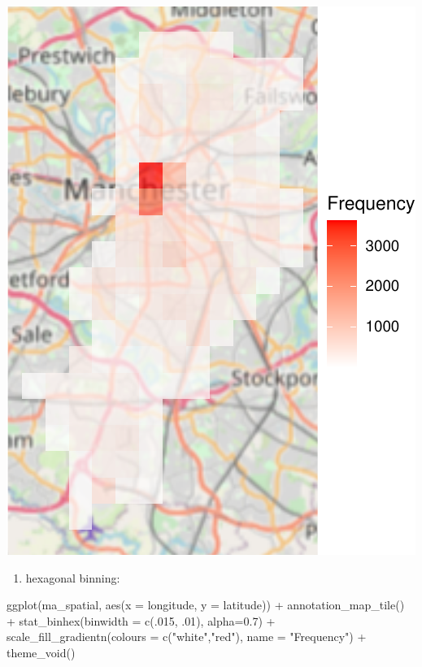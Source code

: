 \documentclass[
]{book}
\makeatletter
\newenvironment{Shaded}{\begin{snugshade}}{\end{snugshade}}
\newcommand{\AttributeTok}[1]{\textcolor[rgb]{0.61,0.61,0.61}{#1}}
\newcommand{\DecValTok}[1]{\textcolor[rgb]{0.06,0.06,0.06}{#1}}
\newcommand{\FloatTok}[1]{\textcolor[rgb]{0.06,0.06,0.06}{#1}}
\newcommand{\FunctionTok}[1]{\textcolor[rgb]{0,0,0}{#1}}
\newcommand{\NormalTok}[1]{#1}
\newcommand{\SpecialCharTok}[1]{\textcolor[rgb]{0,0,0}{#1}}
\newcommand{\StringTok}[1]{\textcolor[rgb]{0.5,0.5,0.5}{#1}}
\providecommand{\tightlist}{%
  \setlength{\itemsep}{0pt}\setlength{\parskip}{0pt}}
\newenvironment{kframe}{%
\medskip{}
\setlength{\fboxsep}{.8em}
 \def\at@end@of@kframe{}%
 \ifinner\ifhmode%
  \def\at@end@of@kframe{\end{minipage}}%
  \begin{minipage}{\columnwidth}%
 \fi\fi%
 \def\FrameCommand##1{\hskip\@totalleftmargin \hskip-\fboxsep
 \colorbox{shadecolor}{##1}\hskip-\fboxsep
     \hskip-\linewidth \hskip-\@totalleftmargin \hskip\columnwidth}%
 \MakeFramed {\advance\hsize-\width
   \@totalleftmargin\z@ \linewidth\hsize
   \@setminipage}}%
 {\par\unskip\endMakeFramed%
 \at@end@of@kframe}
\renewenvironment{Shaded}{\begin{kframe}}{\end{kframe}}
\makeatother
\begin{document}
\includegraphics{crime_mapping_files/figure-latex/unnamed-chunk-128-1.pdf}

\begin{enumerate}
\def\labelenumi{\alph{enumi})}
\setcounter{enumi}{1}
\tightlist
\item
  hexagonal binning:
\end{enumerate}

\begin{Shaded}
\begin{Highlighting}[]
\FunctionTok{ggplot}\NormalTok{(ma\_spatial, }\FunctionTok{aes}\NormalTok{(}\AttributeTok{x =}\NormalTok{ longitude, }\AttributeTok{y =}\NormalTok{ latitude)) }\SpecialCharTok{+} 
  \FunctionTok{annotation\_map\_tile}\NormalTok{() }\SpecialCharTok{+} 
  \FunctionTok{stat\_binhex}\NormalTok{(}\AttributeTok{binwidth =} \FunctionTok{c}\NormalTok{(.}\DecValTok{015}\NormalTok{, .}\DecValTok{01}\NormalTok{), }\AttributeTok{alpha=}\FloatTok{0.7}\NormalTok{) }\SpecialCharTok{+} 
  \FunctionTok{scale\_fill\_gradientn}\NormalTok{(}\AttributeTok{colours =} \FunctionTok{c}\NormalTok{(}\StringTok{"white"}\NormalTok{,}\StringTok{"red"}\NormalTok{), }
                       \AttributeTok{name =} \StringTok{"Frequency"}\NormalTok{) }\SpecialCharTok{+} 
  \FunctionTok{theme\_void}\NormalTok{()}
\end{Highlighting}
\end{Shaded}
\end{document}
